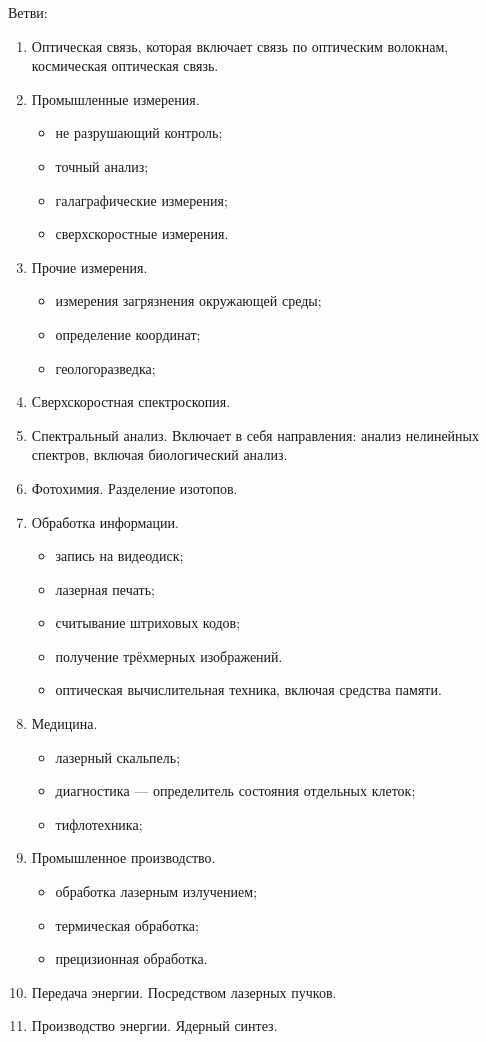 \documentclass[12pt, russian, oneside, article]{ncc}
\begin{document}
Ветви:
\begin{enumerate}
\item Оптическая связь, которая включает связь по оптическим волокнам, космическая оптическая связь.
\item Промышленные измерения.

\begin{itemize}
\item не разрушающий контроль;
\item точный анализ;
\item галаграфические измерения;
\item сверхскоростные измерения.
\end{itemize}

\item Прочие измерения.

\begin{itemize}
\item измерения загрязнения окружающей среды;
\item определение координат;
\item геологоразведка;
\end{itemize}

\item Сверхскоростная спектроскопия.
\item Спектральный анализ. Включает в себя направления: анализ нелинейных спектров, включая биологический анализ.
\item Фотохимия. Разделение изотопов.
\item Обработка информации.

\begin{itemize}
\item запись на видеодиск;
\item лазерная печать;
\item считывание штриховых кодов;
\item получение трёхмерных изображений.
\item оптическая вычислительная техника, включая средства памяти.
\end{itemize}

\item Медицина.

\begin{itemize}
\item лазерный скальпель;
\item диагностика --- определитель состояния отдельных клеток;
\item тифлотехника;
\end{itemize}

\item Промышленное производство.

\begin{itemize}
\item обработка лазерным излучением;
\item термическая обработка;
\item прецизионная обработка.
\end{itemize}

\item Передача энергии. Посредством лазерных пучков.
\item Производство энергии. Ядерный синтез.
\end{enumerate}
\end{document}
